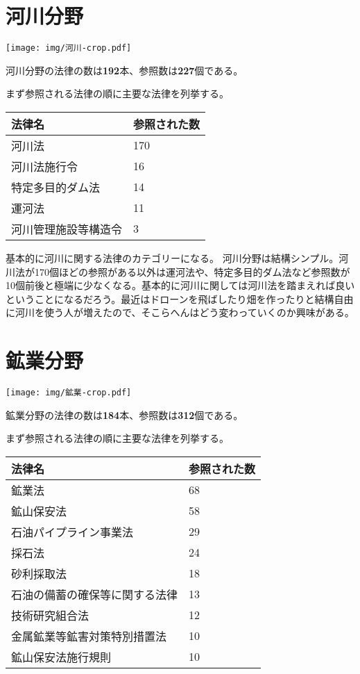 \documentclass[a5j,openany,twoside]{jsbook}
\begin{document}
\section{河川分野}

\texttt{[image: img/河川-crop.pdf]}

河川分野の法律の数は\textbf{192}本、参照数は\textbf{227}個である。

まず参照される法律の順に主要な法律を列挙する。

\begin{table}[htb]
  \begin{tabular}{|l|l|}  \hline
法律名 & 参照された数 \\ \hline \hline
河川法 & 170 \\
河川法施行令 & 16 \\
特定多目的ダム法 & 14 \\
運河法 & 11 \\
河川管理施設等構造令 & 3 \\ \hline
  \end{tabular}
\end{table}

基本的に河川に関する法律のカテゴリーになる。
河川分野は結構シンプル。河川法が170個ほどの参照がある以外は運河法や、特定多目的ダム法など参照数が10個前後と極端に少なくなる。基本的に河川に関しては河川法を踏まえれば良いということになるだろう。最近はドローンを飛ばしたり畑を作ったりと結構自由に河川を使う人が増えたので、そこらへんはどう変わっていくのか興味がある。

\section{鉱業分野}

\texttt{[image: img/鉱業-crop.pdf]}

鉱業分野の法律の数は\textbf{184}本、参照数は\textbf{312}個である。

まず参照される法律の順に主要な法律を列挙する。

\begin{table}[htb]
  \begin{tabular}{|l|l|}  \hline
法律名 & 参照された数 \\ \hline \hline
鉱業法 & 68 \\
鉱山保安法 & 58 \\
石油パイプライン事業法 & 29 \\
採石法 & 24 \\
砂利採取法 & 18 \\
石油の備蓄の確保等に関する法律 & 13 \\
技術研究組合法 & 12 \\
金属鉱業等鉱害対策特別措置法 & 10 \\
鉱山保安法施行規則 & 10 \\ \hline
  \end{tabular}
\end{table}
\end{document}
